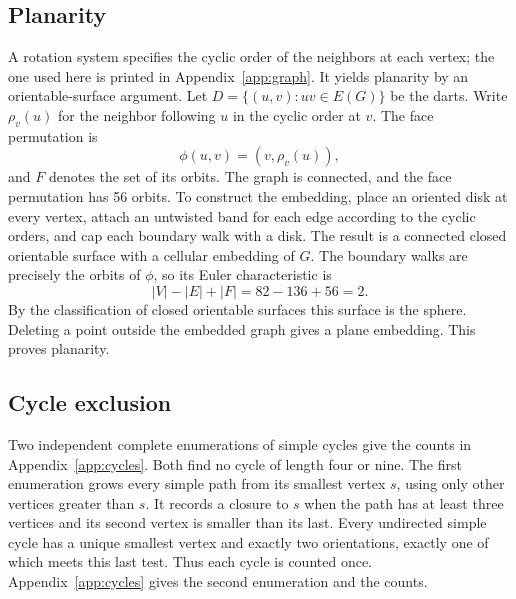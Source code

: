 \documentclass[11pt]{article}
\begin{document}
\subsection{Planarity}\label{app:embedding}
A rotation system specifies the cyclic order of the neighbors at each
vertex; the one used here is printed in Appendix~\ref{app:graph}. It
yields planarity by an orientable-surface argument.
Let $D=\{(u,v):uv\in E(G)\}$ be the darts. Write
$\rho_v(u)$ for the neighbor following $u$ in the cyclic order at $v$.
The face permutation is
\[
   \phi(u,v)=(v,\rho_v(u)),
\]
and $F$ denotes the set of its orbits.
The graph is connected, and the face permutation has 56 orbits.
To construct the embedding,
place an oriented disk at every vertex, attach an untwisted band for
each edge according to the cyclic orders, and cap each boundary walk
with a disk. The result is a connected closed orientable surface with
a cellular embedding of $G$. The boundary walks are precisely the
orbits of $\phi$, so its Euler characteristic is
\[
   |V|-|E|+|F|=82-136+56=2.
\]
By the classification of closed orientable surfaces this surface is the
sphere. Deleting a point outside the embedded graph gives a plane
embedding. This proves planarity.

\subsection{Cycle exclusion}\label{sec:cycles}
Two independent complete enumerations of simple cycles give the counts in
Appendix~\ref{app:cycles}. Both find no cycle of length four or nine.
The first enumeration grows every simple path from its smallest vertex
$s$, using only other vertices greater than $s$. It records a closure
to $s$ when the path has at least three vertices and its second vertex
is smaller than its last. Every undirected simple cycle has a unique
smallest vertex and exactly two orientations, exactly one of which meets
this last test. Thus each cycle is counted once.
Appendix~\ref{app:cycles} gives the second enumeration and the counts.

\end{document}
